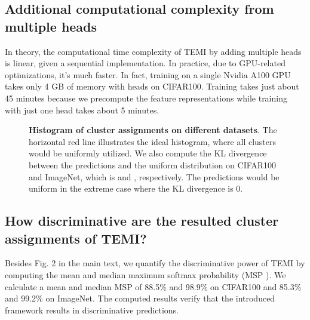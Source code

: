 \documentclass{bmvc2k}
\begin{document}
\subsection{Additional computational complexity from multiple heads}
In theory, the computational time complexity of TEMI by adding multiple heads is linear, given a sequential implementation. In practice, due to GPU-related optimizations, it's much faster. In fact, training on a single Nvidia A100 GPU takes only 4 GB of memory with  heads on CIFAR100. Training takes just about 45 minutes because we precompute the feature representations while training with just one head takes about 5 minutes.

\begin{figure*}[h]
    \begin{center}
    \newline
    \caption{\textbf{Histogram of cluster assignments on different datasets}. The horizontal red line illustrates the ideal histogram, where all clusters would be uniformly utilized. We also compute the KL divergence between the predictions and the uniform distribution on CIFAR100 and ImageNet, which is  and , respectively. The predictions would be uniform in the extreme case where the KL divergence is 0.}
    \label{fig:pk_histogram}
     \end{center}
\end{figure*} 
\subsection{How discriminative are the resulted cluster assignments of TEMI?}
Besides Fig. 2 in the main text, we quantify the discriminative power of TEMI by computing the mean and median maximum softmax probability (MSP \cite{hendrycks2016msp}). We calculate a mean and median MSP of 88.5\% and 98.9\% on CIFAR100 and 85.3\% and 99.2\% on ImageNet. The computed results verify that the introduced framework results in discriminative predictions.
\end{document}
